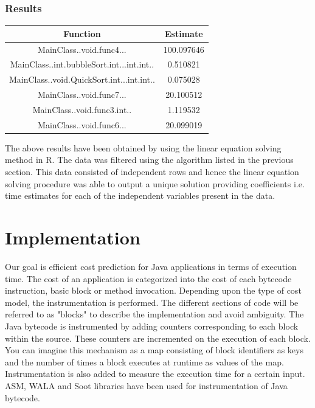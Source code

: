 \documentclass[11pt]{article}
\begin{document}
\subsubsection{Results}
\begin{center}
\begin{tabular}{|c|c|}
\hline
Function&Estimate\\
\hline
MainClass..void.func4...&100.097646\\
MainClass..int.bubbleSort.int...int.int..&0.510821\\
MainClass..void.QuickSort.int...int.int..&0.075028\\
MainClass..void.func7...&20.100512\\
MainClass..void.func3.int..&1.119532\\
MainClass..void.func6...&20.099019\\
\hline
\end{tabular}
\end{center}                           

The above results have been obtained by using the linear equation solving method in R. The data was filtered using the algorithm listed in the previous section. This data consisted of independent rows and hence the linear equation solving procedure was able to output a unique solution providing coefficients i.e. time estimates for each of the independent variables present in the data.\\
\newpage

\section{Implementation}
Our goal is efficient cost prediction for Java applications in terms of execution time. The cost of an application is categorized into the cost of each bytecode instruction, basic block or method invocation. Depending upon the type of cost model, the instrumentation is performed. The different sections of code will be referred to as "blocks" to describe the implementation and avoid ambiguity. The Java bytecode is instrumented by adding counters corresponding to each block within the source. These counters are incremented on the execution of each block. You can imagine this mechanism as a map consisting of block identifiers as keys and the number of times a block executes at runtime as values of the map. Instrumentation is also added to measure the execution time for a certain input. ASM, WALA and Soot libraries have been used for instrumentation of Java bytecode.\newline
\end{document}
